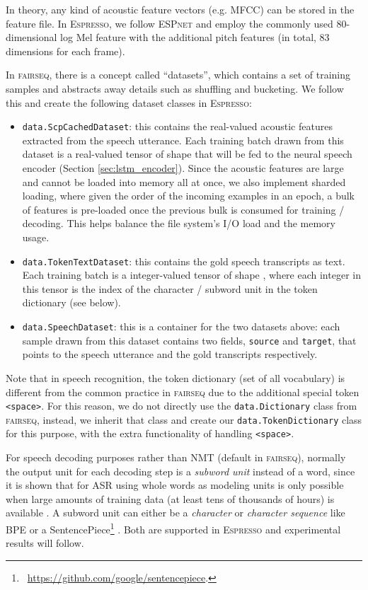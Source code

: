 \documentclass{article}
\def\espresso{\textsc{Espresso}\xspace}
\def\fairseq{\textsc{fairseq}\xspace}
\def\espnet{\textsc{ESPnet}\xspace}
\begin{document}
In theory, any kind of acoustic feature vectors (e.g. MFCC) can be stored in the feature file. In \espresso, we follow \espnet and employ the commonly used 80-dimensional log Mel feature with the additional pitch features (in total, 83 dimensions for each frame).

In \fairseq, there is a concept called ``datasets'', which contains a set of training samples and abstracts away details such as shuffling and bucketing. We follow this and create the following dataset classes in \espresso: 
\begin{itemize} \setlength\itemsep{0cm}
    \item \texttt{data.ScpCachedDataset}: this contains the real-valued acoustic features extracted from the speech utterance. Each training batch drawn from this dataset is a real-valued tensor of shape  that will be fed to the neural speech encoder (Section \ref{sec:lstm_encoder}). Since the acoustic features are large and cannot be loaded into memory all at once, we also implement sharded loading, where given the order of the incoming examples in an epoch, a bulk of features is pre-loaded once the previous bulk is consumed for training / decoding. This helps balance the file system's I/O load and the memory usage.
    \item \texttt{data.TokenTextDataset}: this contains the gold speech transcripts as text. Each training batch is a integer-valued tensor of shape , where each integer in this tensor is the index of the character / subword unit in the token dictionary (see below).
    \item \texttt{data.SpeechDataset}: this is a container for the two datasets above: each sample drawn from this dataset contains two fields, \texttt{source} and \texttt{target}, that points to the speech utterance and the gold transcripts respectively.
\end{itemize}

\noindent Note that in speech recognition, the token dictionary (set of all vocabulary) is different from the common practice in \fairseq due to the additional special token \texttt{<space>}. For this reason, we do not directly use the \texttt{data.Dictionary} class from \fairseq, instead, we inherit that class and create our \texttt{data.TokenDictionary} class for this purpose, with the extra functionality of handling \texttt{<space>}.

For speech decoding purposes rather than NMT (default in \fairseq), normally the output unit for each decoding step is a \emph{subword unit} instead of a word, since it is shown that for ASR using whole words as modeling units is only possible when large amounts of training data (at least tens of thousands of hours) is available \cite{soltau2017neural,qudhkhasi2018building}. A subword unit can either be a \emph{character} or \emph{character sequence} like BPE \cite{sennrich2016neural} or a SentencePiece\footnote{~\url{https://github.com/google/sentencepiece}.} \cite{kudo2018subword}. Both are supported in \espresso and experimental results will follow.
\end{document}
